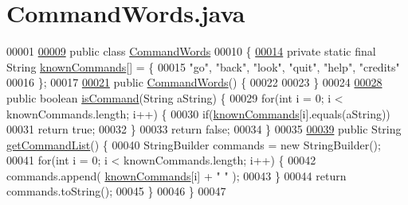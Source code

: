 \hypertarget{CommandWords_8java_source}{\section{Command\-Words.\-java}
}

\begin{DoxyCode}
00001 
\hypertarget{CommandWords_8java_source_l00009}{}\hyperlink{classCommandWords}{00009} \textcolor{keyword}{public} \textcolor{keyword}{class }\hyperlink{classCommandWords}{CommandWords}
00010 \{
\hypertarget{CommandWords_8java_source_l00014}{}\hyperlink{classCommandWords_a328bb081d9a9e5cb1aa6362523b28783}{00014}     \textcolor{keyword}{private} \textcolor{keyword}{static} \textcolor{keyword}{final} String \hyperlink{classCommandWords_a328bb081d9a9e5cb1aa6362523b28783}{knownCommands}[] = \{
00015         \textcolor{stringliteral}{"go"}, \textcolor{stringliteral}{"back"}, \textcolor{stringliteral}{"look"}, \textcolor{stringliteral}{"quit"}, \textcolor{stringliteral}{"help"}, \textcolor{stringliteral}{"credits"}
00016     \};
00017 
\hypertarget{CommandWords_8java_source_l00021}{}\hyperlink{classCommandWords_a2d8c096723adb3f822cc001bccd92ed7}{00021}     \textcolor{keyword}{public} \hyperlink{classCommandWords_a2d8c096723adb3f822cc001bccd92ed7}{CommandWords}() \{
00022 
00023     \}
00024 
\hypertarget{CommandWords_8java_source_l00028}{}\hyperlink{classCommandWords_a98619d278b3fa23fed18b5834f9d20a8}{00028}     \textcolor{keyword}{public} \textcolor{keywordtype}{boolean} \hyperlink{classCommandWords_a98619d278b3fa23fed18b5834f9d20a8}{isCommand}(String aString) \{
00029         \textcolor{keywordflow}{for}(\textcolor{keywordtype}{int} i = 0; i < knownCommands.length; i++) \{
00030             \textcolor{keywordflow}{if}(\hyperlink{classCommandWords_a328bb081d9a9e5cb1aa6362523b28783}{knownCommands}[i].equals(aString))
00031                 \textcolor{keywordflow}{return} \textcolor{keyword}{true};
00032         \}
00033         \textcolor{keywordflow}{return} \textcolor{keyword}{false};
00034     \}
00035 
\hypertarget{CommandWords_8java_source_l00039}{}\hyperlink{classCommandWords_aa26f54985e39543739e0ae291dcdb8f1}{00039}     \textcolor{keyword}{public} String \hyperlink{classCommandWords_aa26f54985e39543739e0ae291dcdb8f1}{getCommandList}() \{
00040         StringBuilder commands = \textcolor{keyword}{new} StringBuilder();
00041         \textcolor{keywordflow}{for}(\textcolor{keywordtype}{int} i = 0; i < knownCommands.length; i++) \{
00042             commands.append( \hyperlink{classCommandWords_a328bb081d9a9e5cb1aa6362523b28783}{knownCommands}[i] + \textcolor{stringliteral}{"  "} );
00043         \}
00044         \textcolor{keywordflow}{return} commands.toString();
00045     \}
00046 \}
00047 
\end{DoxyCode}
